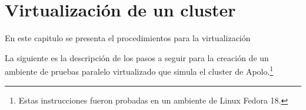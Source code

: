 \section{Virtualización de un cluster}




En este capitulo se presenta el procedimientos para la virtualización 



La siguiente es la descripción de los pasos a seguir para la creación de un ambiente de pruebas paralelo virtualizado que simula el cluster de Apolo.\footnote{Estas instrucciones fueron probadas en un ambiente de Linux Fedora 18.}


